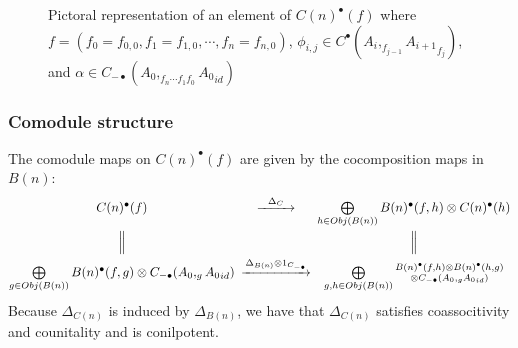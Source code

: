 \begin{figure}
\centerline{}
\caption{Pictoral representation of an element of
$C(n)^\bullet(f)$ where 
$f = (f_0 = f_{0,0}, f_1 = f_{1,0}, \cdots, f_n = f_{n,0})$, 
$\phi_{i,j} \in C^\bullet(A_i, _{f_{j-1}}{A_{i+1}}_{f_j})$, and 
$\alpha \in C_{-\bullet}(A_0, _{f_n\cdots f_1 f_0}{A_0}_{id})$}
 \label{fig:phi|alpha}
\end{figure}
%
\subsubsection{Comodule structure}\label{sec:comod_strre}
The comodule maps on $C(n)^\bullet(f)$ are given by the
cocomposition maps in $B(n)$: 
%
\begin{equation*}
\begin{CD}
C(n)^\bullet(f) @>\Delta_C>>
\bigoplus\limits_{h \in Obj(B(n))} B(n)^\bullet(f,h) \otimes C(n)^\bullet(h) \\
@|  @| \\
\bigoplus\limits_{g \in Obj(B(n))} B(n)^\bullet(f,g) \otimes C_{-\bullet}(A_0, _g{A_0}_{id})
@>\Delta_{B(n)}\otimes 1_{C_{-\bullet}}>>
\bigoplus\limits_{g,h\in Obj(B(n))} \substack{B(n)^\bullet(f,h)\otimes B(n)^\bullet(h,g) \\ \otimes 
C_{-\bullet}(A_0, _g{A_0}_{id})}
\end{CD} 
\end{equation*}
%
Because $\Delta_{C(n)}$ is induced by 
$\Delta_{B(n)}$, we have that $\Delta_{C(n)}$ 
satisfies coassocitivity and counitality 
and is conilpotent. 

